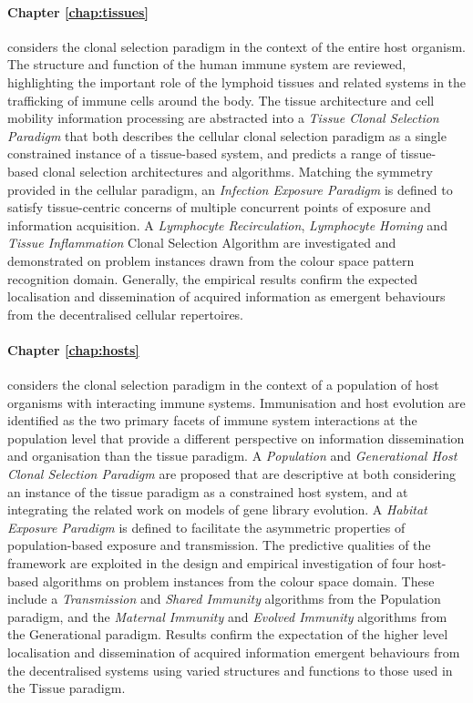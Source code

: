 \paragraph{Chapter \ref{chap:tissues}} considers the clonal selection paradigm in the context of the entire host organism. The structure and function of the human immune system are reviewed, highlighting the important role of the lymphoid tissues and related systems in the trafficking of immune cells around the body. The tissue architecture and cell mobility information processing are abstracted into a \emph{Tissue Clonal Selection Paradigm} that both describes the cellular clonal selection paradigm as a single constrained instance of a tissue-based system, and predicts a range of tissue-based clonal selection architectures and algorithms. Matching the symmetry provided in the cellular paradigm, an \emph{Infection Exposure Paradigm} is defined to satisfy tissue-centric concerns of multiple concurrent points of exposure and information acquisition. A \emph{Lymphocyte Recirculation}, \emph{Lymphocyte Homing} and \emph{Tissue Inflammation} Clonal Selection Algorithm are investigated and demonstrated on problem instances drawn from the colour space pattern recognition domain. Generally, the empirical results confirm the expected localisation and dissemination of acquired information as emergent behaviours from the decentralised cellular repertoires.

\paragraph{Chapter \ref{chap:hosts}} considers the clonal selection paradigm in the context of a population of host organisms with interacting immune systems. Immunisation and host evolution are identified as the two primary facets of immune system interactions at the population level that provide a different perspective on information dissemination and organisation than the tissue paradigm. A \emph{Population} and \emph{Generational Host Clonal Selection Paradigm} are proposed that are descriptive at both considering an instance of the tissue paradigm as a constrained host system, and at integrating the related work on models of gene library evolution. A \emph{Habitat Exposure Paradigm} is defined to facilitate the asymmetric properties of population-based exposure and transmission. The predictive qualities of the framework are exploited in the design and empirical investigation of four host-based algorithms on problem instances from the colour space domain. These include a \emph{Transmission} and \emph{Shared Immunity} algorithms from the Population paradigm, and the \emph{Maternal Immunity} and \emph{Evolved Immunity} algorithms from the Generational paradigm. Results confirm the expectation of the higher level localisation and dissemination of acquired information emergent behaviours from the decentralised systems using varied structures and functions to those used in the Tissue paradigm. 

